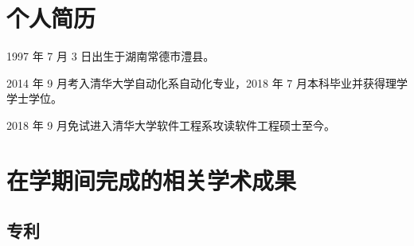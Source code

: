 
\begin{resume}

  \section*{个人简历}

  1997 年 7 月 3 日出生于湖南常德市澧县。

  2014 年 9 月考入清华大学自动化系自动化专业，2018 年 7 月本科毕业并获得理学学士学位。

  2018 年 9 月免试进入清华大学软件工程系攻读软件工程硕士至今。


  \section*{在学期间完成的相关学术成果}

  \subsection*{专利}

  \begin{achievements}
    \item 
  \end{achievements}

\end{resume}
